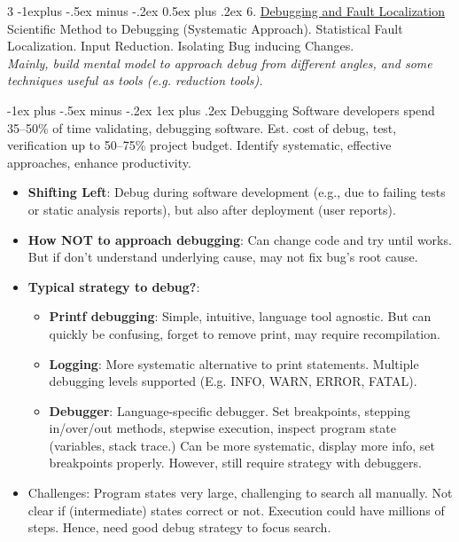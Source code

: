 \documentclass[a4paper, 10pt, landscape]{article}
\makeatletter
\renewcommand{\subsection}{\@startsection{subsection}{2}{0mm}%
                                {-1explus -.5ex minus -.2ex}%
                                {0.5ex plus .2ex}%
                                {\normalfont\normalsize\bfseries}}
\renewcommand{\subsubsection}{\@startsection{subsubsection}{3}{0mm}%
                                {-1ex plus -.5ex minus -.2ex}%
                                {1ex plus .2ex}%
                                {\normalfont\small\bfseries}}
\makeatother
\begin{document}
\begin{multicols*}{3}
\subsection{6. \underline{Debugging and Fault Localization}}
Scientific Method to Debugging (Systematic Approach). Statistical Fault 
Localization. Input Reduction. Isolating Bug inducing Changes. \\
\textit{Mainly, build mental model to approach debug from different angles, and some techniques useful as tools (e.g. reduction tools).}

\subsubsection{Debugging}
Software developers spend 35–50\% of time validating, debugging software. Est. cost of debug, test, verification up to 50–75\% project budget. Identify systematic, effective approaches, enhance productivity. 
\begin{itemize}[itemsep=-1pt]
\item \textbf{Shifting Left}: Debug during software development (e.g., due to failing tests or static analysis reports), but also after deployment (user reports).
\item \textbf{How NOT to approach debugging}: Can change code and try until works. But if don't understand underlying cause, may not fix bug’s root cause.
\item \textbf{Typical strategy to debug?}:
\begin{itemize}[itemsep=-1pt]
	\item \textbf{Printf debugging}: Simple, intuitive, language tool agnostic. But can quickly be confusing, forget to remove print, may require recompilation.
	\item \textbf{Logging}: More systematic alternative to print statements. Multiple debugging levels supported (E.g. INFO, WARN, ERROR, FATAL).
	\item \textbf{Debugger}: Language-specific debugger. Set breakpoints, stepping in/over/out methods, stepwise execution, inspect program state (variables, stack trace.) Can be more systematic, display more info, set breakpoints properly. However, still require strategy with debuggers.
\end{itemize}
\item Challenges: Program states very large, challenging to search all manually. Not clear if (intermediate) states correct or not. Execution could have millions of steps. Hence, need good debug strategy to focus search.
\end{itemize}


\end{multicols*}
\end{document}
